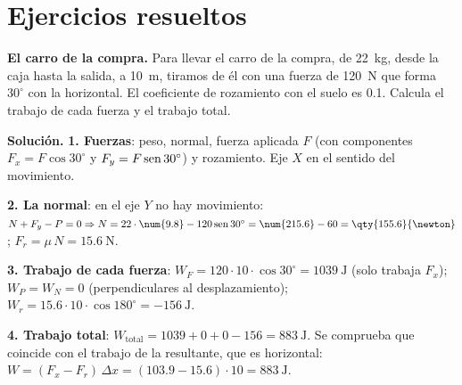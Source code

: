 
\section{Ejercicios resueltos}\label{sec:ud12-resueltos}

\begin{example}
    \textbf{El carro de la compra.} Para llevar el carro de la compra, de \qty{22}{\kg}, desde la caja hasta la salida, a \qty{10}{\m},
    tiramos de él con una fuerza de \qty{120}{\newton} que forma \(30^\circ\) con la horizontal. El coeficiente de rozamiento con el
    suelo es \num{0.1}. Calcula el trabajo de cada fuerza y el trabajo total.

    \textbf{Solución.} \textbf{1. Fuerzas}: peso, normal, fuerza aplicada \(F\) (con componentes \(F_x = F\cos 30^\circ\) y
    \(F_y = F\operatorname{sen} 30^\circ\)) y rozamiento. Eje \(X\) en el sentido del movimiento.

    \textbf{2. La normal}: en el eje \(Y\) no hay movimiento: \(N + F_y - P = 0 \Rightarrow N = 22 \cdot \num{9.8} - 120\sen 30^\circ =
    \num{215.6} - 60 = \qty{155.6}{\newton}\); \(F_r = \mu\,N = \qty{15.6}{\newton}\).

    \textbf{3. Trabajo de cada fuerza}:
    \(W_F = 120 \cdot 10 \cdot \cos 30^\circ = \qty{1039}{\joule}\) (solo trabaja \(F_x\));
    \(W_P = W_N = 0\) (perpendiculares al desplazamiento);
    \(W_r = \num{15.6} \cdot 10 \cdot \cos 180^\circ = \qty{-156}{\joule}\).

    \textbf{4. Trabajo total}: \(W_{\text{total}} = 1039 + 0 + 0 - 156 = \qty{883}{\joule}\). Se comprueba que coincide con el trabajo
    de la resultante, que es horizontal: \(W = (F_x - F_r)\,\Delta x = (\num{103.9} - \num{15.6}) \cdot 10 = \qty{883}{\joule}\).
\end{example}

